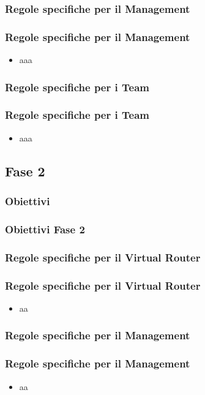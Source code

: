 \documentclass{beamer}
\begin{document}
\subsubsection{Regole specifiche per il Management}
\begin{frame}
    \frametitle{Regole specifiche per il Management}
    \begin{itemize}
        \item aaa
    \end{itemize}

\end{frame}

\subsubsection{Regole specifiche per i Team}
\begin{frame}
    \frametitle{Regole specifiche per i Team}
    \begin{itemize}
        \item aaa
    \end{itemize}

\end{frame}

\subsection{Fase 2}
\subsubsection{Obiettivi}
\begin{frame}
    \frametitle{Obiettivi Fase 2}

    

\end{frame}
\subsubsection{Regole specifiche per il Virtual Router}
\begin{frame}
    \frametitle{Regole specifiche per il Virtual Router}
    \begin{itemize}
        \item aa
    \end{itemize}
\end{frame}


\subsubsection{Regole specifiche per il Management}
\begin{frame}
    \frametitle{Regole specifiche per il Management}
    \begin{itemize}
        \item aa
    \end{itemize}

\end{frame}
\end{document}
